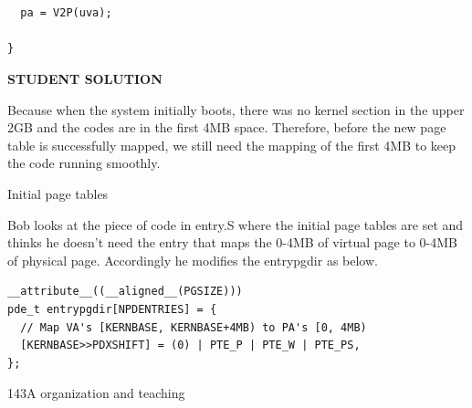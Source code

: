 \documentclass[11pt]{exam}
\begin{document}
\begin{questions}
\begin{parts}
\begin{verbatim}
  
  
  pa = V2P(uva);
  
}
\end{verbatim}

\textbf{STUDENT SOLUTION } 
\begin{adjustwidth}{1.5em}{1em}
Because when the system initially boots, there was no kernel section in the upper 2GB and the codes are in the first 4MB space. Therefore, before the new page table is successfully mapped, we still need the mapping of the first 4MB to keep the code running smoothly.
  
  
\end{adjustwidth}
\vfill

\end{parts} 


\addpoints

\question Initial page tables

Bob looks at the piece of code in entry.S where the initial page tables are
set and thinks he doesn't need the entry that maps the 0-4MB of virtual
page to 0-4MB of physical page. Accordingly he modifies the entrypgdir as
below.

\begin{verbatim}
__attribute__((__aligned__(PGSIZE)))
pde_t entrypgdir[NPDENTRIES] = {
  // Map VA's [KERNBASE, KERNBASE+4MB) to PA's [0, 4MB)
  [KERNBASE>>PDXSHIFT] = (0) | PTE_P | PTE_W | PTE_PS,
};
\end{verbatim}



\newpage

\addpoints
\question 143A organization and teaching



\end{questions}
\afterpage{\null\newpage}
\end{document}

